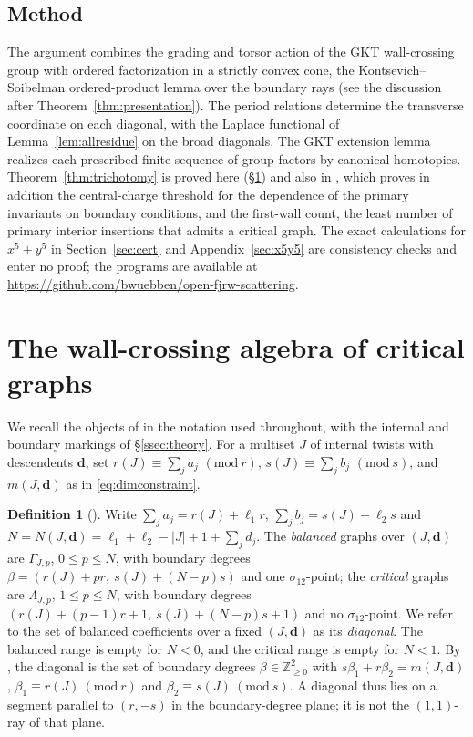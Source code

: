 \documentclass[11pt]{amsart}
\theoremstyle{definition}
\newtheorem{definition}[theorem]{Definition}
\theoremstyle{remark}
\newcommand{\ZZ}{\mathbb{Z}}
\begin{document}
\subsection{Method}
The argument combines the grading and torsor action of the GKT wall-crossing
group with ordered factorization in a strictly convex cone, the
Kontsevich--Soibelman ordered-product lemma over the boundary rays (see the
discussion after Theorem~\ref{thm:presentation}).  The period
relations determine the transverse coordinate on each diagonal, with the
Laplace functional of Lemma~\ref{lem:allresidue} on the broad diagonals.  The
GKT extension lemma realizes each prescribed finite
sequence of group factors by canonical homotopies.
Theorem~\ref{thm:trichotomy} is proved here (\S\ref{sec:algebra}) and also in
\cite{note}, which proves in addition the central-charge threshold for the
dependence of the primary invariants on boundary conditions, and the
first-wall count, the least number of primary interior insertions that admits
a critical graph.  The exact calculations for $x^5+y^5$ in
Section~\ref{sec:cert} and Appendix~\ref{sec:x5y5} are consistency checks and
enter no proof; the programs are available at
\url{https://github.com/bwuebben/open-fjrw-scattering}.

\section{The wall-crossing algebra of critical graphs}
\label{sec:algebra}

We recall the objects of \cite[\S2.4, \S4.3]{GKT} in the notation used
throughout, with the internal and boundary markings of \S\ref{ssec:theory}.
For a multiset $J$ of internal
twists with descendents $\mathbf d$, set $r(J)\equiv\sum_{j}a_{j}$
$(\mathrm{mod}\ r)$, $s(J)\equiv\sum_{j}b_{j}$ $(\mathrm{mod}\ s)$, and
$m(J,\mathbf d)$ as in \eqref{eq:dimconstraint}.

\begin{definition}[{\cite[Not.~2.40]{GKT}}]
\label{def:diagonal}
Write $\sum_{j}a_{j}=r(J)+\ell_{1}r$, $\sum_{j}b_{j}=s(J)+\ell_{2}s$ and
$N=N(J,\mathbf d)=\ell_{1}+\ell_{2}-|J|+1+\sum_{j}d_{j}$. The \emph{balanced}
graphs over $(J,\mathbf d)$ are $\Gamma_{J,p}$, $0\le p\le N$, with boundary
degrees $\beta=(r(J)+pr,\ s(J)+(N{-}p)s)$ and one $\sigma_{12}$-point; the
\emph{critical} graphs are $\Lambda_{J,p}$, $1\le p\le N$, with boundary degrees
$(r(J)+(p{-}1)r+1,\ s(J)+(N{-}p)s+1)$ and no $\sigma_{12}$-point. We refer to the
set of balanced coefficients over a fixed $(J,\mathbf d)$ as its \emph{diagonal}.
The balanced range is empty for $N<0$, and the critical range is empty for
$N<1$. By \cite[Prop.~2.31]{GKT}, the diagonal is the set of boundary degrees
$\beta\in\ZZ_{\ge0}^2$ with $s\beta_{1}+r\beta_{2}=m(J,\mathbf d)$,
$\beta_1\equiv r(J)\ (\mathrm{mod}\ r)$ and
$\beta_2\equiv s(J)\ (\mathrm{mod}\ s)$.  A diagonal thus lies on a segment
parallel to $(r,-s)$ in the boundary-degree plane; it is not the $(1,1)$-ray of
that plane.
\end{definition}
\end{document}
